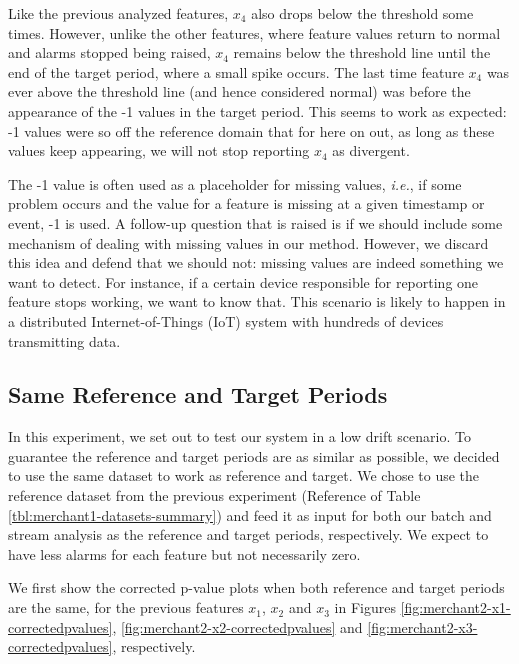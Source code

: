 \documentclass[sigconf]{acmart}
\begin{document}
Like the previous analyzed features, $x_4$ also drops below the threshold some times. However, unlike the other features, where feature values return to normal and alarms stopped being raised, $x_4$ remains below the threshold line until the end of the target period, where a small spike occurs. The last time feature $x_4$ was ever above the threshold line (and hence considered normal) was before the appearance of the -1 values in the target period. This seems to work as expected: -1 values were so off the reference domain that for here on out, as long as these values keep appearing, we will not stop reporting $x_4$ as divergent.

The -1 value is often used as a placeholder for missing values, \textit{i.e.}, if some problem occurs and the value for a feature is missing at a given timestamp or event, -1 is used. A follow-up question that is raised is if we should include some mechanism of dealing with missing values in our method. However, we discard this idea and defend that we should not: missing values are indeed something we want to detect. For instance, if a certain device responsible for reporting one feature stops working, we want to know that. This scenario is likely to happen in a distributed Internet-of-Things (IoT) system with hundreds of devices transmitting data. 

\subsection{Same Reference and Target Periods}
In this experiment, we set out to test our system in a low drift scenario. To guarantee the reference and target periods are as similar as possible, we decided to use the same dataset to work as reference and target. We chose to use the reference dataset from the previous experiment (Reference of Table \ref{tbl:merchant1-datasets-summary}) and feed it as input for both our batch and stream analysis as the reference and target periods, respectively. We expect to have less alarms for each feature but not necessarily zero.

We first show the corrected p-value plots when both reference and target periods are the same, for the previous features $x_1$, $x_2$ and $x_3$ in Figures \ref{fig:merchant2-x1-correctedpvalues}, \ref{fig:merchant2-x2-correctedpvalues} and \ref{fig:merchant2-x3-correctedpvalues}, respectively. 
\end{document}
